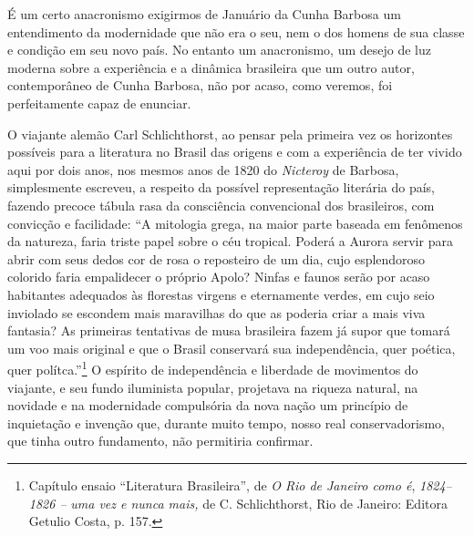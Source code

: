 É um certo anacronismo exigirmos de Januário da Cunha Barbosa um
entendimento da modernidade que não era o seu, nem o dos homens de sua
classe e condição em seu novo país. No entanto um anacronismo, um desejo
de luz moderna sobre a experiência e a dinâmica brasileira que um outro
autor, contemporâneo de Cunha Barbosa, não por acaso, como veremos, foi
perfeitamente capaz de enunciar.

O viajante alemão Carl Schlichthorst, ao pensar pela primeira vez os
horizontes possíveis para a literatura no Brasil das origens e com a
experiência de ter vivido aqui por dois anos, nos mesmos anos de 1820 do
\emph{Nicteroy} de Barbosa, simplesmente escreveu, a respeito da
possível representação literária do país, fazendo precoce tábula rasa da
consciência convencional dos brasileiros, com convicção e facilidade:
``A mitologia grega, na maior parte baseada em fenômenos da natureza,
faria triste papel sobre o céu tropical. Poderá a Aurora servir para
abrir com seus dedos cor de rosa o reposteiro de um dia, cujo
esplendoroso colorido faria empalidecer o próprio Apolo? Ninfas e faunos
serão por acaso habitantes adequados às florestas virgens e eternamente
verdes, em cujo seio inviolado se escondem mais maravilhas do que as
poderia criar a mais viva fantasia? As primeiras tentativas de musa
brasileira fazem já supor que tomará um voo mais original e que o Brasil
conservará sua independência, quer poética, quer polítca.''\footnote{Capítulo
  ensaio ``Literatura Brasileira'', de \emph{O Rio de Janeiro como é},
  \emph{1824--1826 --} \emph{uma vez e nunca mais,} de C. Schlichthorst,
  Rio de Janeiro: Editora Getulio Costa, p. 157.} O espírito de
independência e liberdade de movimentos do viajante, e seu fundo
iluminista popular, projetava na riqueza natural, na novidade e na
modernidade compulsória da nova nação um princípio de inquietação e
invenção que, durante muito tempo, nosso real conservadorismo, que tinha
outro fundamento, não permitiria confirmar.

